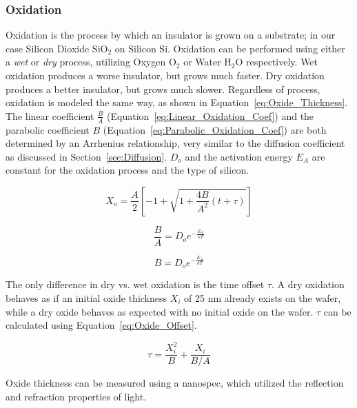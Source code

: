 \documentclass[letter,12pt]{article}
\begin{document}
		\subsubsection{Oxidation}\label{sec:Oxidation}
			\FloatBarrier
			Oxidation is the process by which an insulator is grown on a substrate; in our case Silicon Dioxide SiO$_2$ on Silicon Si. Oxidation can be performed using either a \textit{wet} or \textit{dry} process, utilizing Oxygen O$_2$ or Water H$_2$O respectively. Wet oxidation produces a worse insulator, but grows much faster.  Dry oxidation produces a better insulator, but grows much slower. Regardless of process, oxidation is modeled the same way, as shown in Equation~\ref{eq:Oxide_Thickness}.  The linear coefficient $\frac{B}{A}$ (Equation~\ref{eq:Linear_Oxidation_Coef}) and the parabolic coefficient $B$ (Equation~\ref{eq:Parabolic_Oxidation_Coef}) are both determined by an Arrhenius relationship, very similar to the diffusion coefficient as discussed in Section~\ref{sec:Diffusion}. $D_o$ and the activation energy $E_A$ are constant for the oxidation process and the type of silicon.
			
			\begin{equation}			
				X_o = \frac{A}{2}\left[-1 + \sqrt{1 + \frac{4B}{A^2}(t + \tau)}\right]
				\label{eq:Oxide_Thickness}	
			\end{equation}
		
			\begin{equation}				
				\frac{B}{A} = D_o e^{-\frac{E_A}{kT}}
				\label{eq:Linear_Oxidation_Coef}
			\end{equation}
			
			\begin{equation}				
				B = D_o e^{-\frac{E_A}{kT}}
				\label{eq:Parabolic_Oxidation_Coef}
			\end{equation}
			
			The only difference in dry vs. wet oxidation is the time offset $\tau$.  A dry oxidation behaves as if an initial oxide thickness $X_i$ of 25 nm already exists on the wafer, while a dry oxide behaves as expected with no initial oxide on the wafer.  $\tau$ can be calculated using Equation~\ref{eq:Oxide_Offset}.
			
			\begin{equation}				
				\tau = \frac{X_i^2}{B} + \frac{X_i}{B/A}
				\label{eq:Oxide_Offset}
			\end{equation}
			
			Oxide thickness can be measured using a nanospec, which utilized the reflection and refraction properties of light.
			
\end{document}
